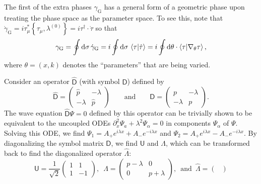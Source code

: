 The first of the extra phases $\gamma_{\text{G}}$ has a general form of a geometric phase upon treating the phase space as the parameter space.
To see this, note that $\dot{\gamma}_{\text{G}} = i\tau^{*}_{\mu}\left\{\tau_{\mu},\lambda^{(0)}\right\} = i\tau^{\dagger}\cdot\dot{\tau}$ so that
%
\begin{equation}
\gamma_{\text{G}} = \oint \mathrm{d}{\sigma}\, \dot{\gamma}_{\text{G}} = i\oint \mathrm{d}{\sigma}\,\mathinner{\langle{\tau|\dot{\tau}}\rangle} = 
i\oint \mathrm{d}\theta\cdot\mathinner{\langle{\tau |\nabla_{\theta}\tau}\rangle},
\end{equation}
%
where $\theta = (x, k)$ denotes the ``parameters'' that are being varied.



\begin{example}
Consider an operator $\widehat{\mathsf{D}}$ (with symbol $\mathsf{D}$) defined by
%
\begin{equation}
  \widehat{\mathsf{D}} =
  \begin{pmatrix}
    \hat{p} & -\lambda\\
    -\lambda & \hat{p}
  \end{pmatrix}
  \qquad\text{and}\qquad
  \mathsf{D} =
  \begin{pmatrix}
    p & -\lambda\\
    -\lambda & p
  \end{pmatrix}.
\end{equation}
%
The wave equation $\widehat{\mathsf{D}}\Psi = 0$ defined by this operator can be trivially shown to be equivalent to the uncoupled ODEs $\partial_{x}^{2}\Psi_{a} + \lambda^{2}\Psi_{\alpha} = 0$ in components $\Psi_{\alpha}$ of $\Psi$.
Solving this ODE, we find $\Psi_{1} = A_{+}e^{i \lambda x} + A_{-}e^{-i\lambda x}$ and $\Psi_{2} = A_{+}e^{i \lambda x} - A_{-}e^{-i\lambda x}$.
%
By diagonalizing the symbol matrix $\mathsf{D}$, we find $\mathsf{U}$ and $\Lambda$, which can be transformed back to find the diagonalized operator $\widehat{\Lambda}$:
%
\begin{equation}
  \mathsf{U} = \frac{1}{\sqrt{2}}
  \begin{pmatrix}
    1 & 1\\
    1 & -1
  \end{pmatrix},\enspace
  \Lambda =
  \begin{pmatrix}
    p - \lambda & 0\\
    0 & p + \lambda
  \end{pmatrix},\enspace
  \text{and}\enspace
  \widehat{\Lambda} =
  \begin{pmatrix}

\end{pmatrix}
\end{equation}
\end{example}
